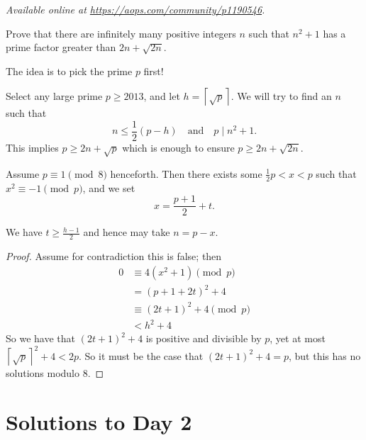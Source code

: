 \textsl{Available online at \url{https://aops.com/community/p1190546}.}
\begin{mdframed}[style=mdpurplebox,frametitle={Problem statement}]
Prove that there are infinitely many positive integers $n$
such that $n^2+1$ has a prime factor greater than $2n + \sqrt{2n}$.
\end{mdframed}
The idea is to pick the prime $p$ first!

Select any large prime $p \ge 2013$,
and let $h = \left\lceil \sqrt p \right\rceil$.
We will try to find an $n$ such that
\[ n \le \frac 12 (p-h) \quad \text{and} \quad p \mid n^2+1. \]
This implies $p \ge 2n+\sqrt{p}$
which is enough to ensure $p \ge 2n + \sqrt{2n}$.

Assume $p \equiv 1 \pmod 8$ henceforth.
Then there exists some $\frac 12 p < x < p$
such that $x^2 \equiv -1 \pmod p$,
and we set \[ x = \frac{p+1}{2} + t. \]
\begin{claim*}
  We have $t \ge \frac{h-1}{2}$ and hence may take $n = p-x$.
\end{claim*}
\begin{proof}
Assume for contradiction this is false; then
\begin{align*}
  0 &\equiv  4(x^2+1) \pmod{p} \\
  &= \left( p+1+2t \right)^2 + 4 \\
  &\equiv (2t+1)^2 + 4 \pmod{p} \\
  &< h^2+4
\end{align*}
So we have that $(2t+1)^2+4$ is positive and divisible by $p$,
yet at most $\left\lceil \sqrt{p} \right\rceil^2 + 4 < 2p$.
So it must be the case that $(2t+1)^2+4 = p$,
but this has no solutions modulo $8$.
\end{proof}
\pagebreak

\section{Solutions to Day 2}
